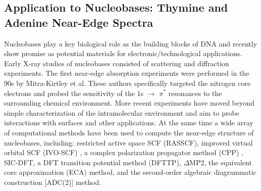\documentclass[12pt]{article}
\begin{document}
\subsection{Application to Nucleobases: Thymine and Adenine Near-Edge Spectra}
Nucleobases play a key biological role as the building blocks of DNA and recently show promise as potential materials for electronic/technological applications. \cite{di_mauro_dna_1993,niemeyer_dna_1997,niemeyer_nanoparticles_2001,song_nucleobase_2012} Early X-ray studies of nucleobases consisted of scattering and diffraction experiments.\cite{langridge_x-ray_1964,sundaralingam_structure_1975,camerman_photodimer_1968,davies_x-ray_1967} The first near-edge absorption experiments were performed in the 90s by Mitra-Kirtley et al.\cite{kirtley_nitrogen_1992} These authors specifically targeted the nitrogen  core electrons and probed the sensitivity of the 1s $\rightarrow$ $\pi^*$ resonances to the surrounding chemical environment. More recent experiments have moved beyond simple characterization of the intramolecular environment and aim to probe interactions with surfaces and other applications.\cite{seifert_molecular_2007,yamada_adsorption_2004,fujii_x-ray_2003,fujii_near-edge_2004}  At the same time a wide array of computational methods have been used to compute the near-edge structure of nucleobases, including: restricted active space SCF (RASSCF),\cite{mochizuki_hf-stex_2001} improved virtual orbital SCF (IVO-SCF) \cite{macnaughton_electronic_2005}, a complex polarization propagator method (CPP) \cite{ekstrom_polarization_2006}, SIC-DFT,\cite{bolognesi_investigation_2009} a DFT transition potential method (DFTTP), \cite{macnaughton_electronic_2005} $\Delta$MP2,\cite{shim_calibration_2011} the equivalent core approximation (ECA) method,\cite{healion_probing_2008} and the second-order algebraic diagrammatic construction [ADC(2)] method.\cite{plekan_theoretical_2008,wenzel_calculating_2014}
  
\end{document}
